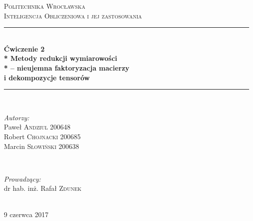 \begin{titlepage}

\newcommand{\HRule}{\rule{\linewidth}{0.5mm}} 
\center 

\textsc{\LARGE Politechnika Wrocławska}\\[1.5cm] 
\textsc{\Large Inteligencja Obliczeniowa i jej zastosowania}\\[0.5cm] 
\HRule \\[0.5cm]
{ \huge \bfseries Ćwiczenie 2 \\*
	Metody redukcji wymiarowości \\*
	– nieujemna faktoryzacja macierzy \\i dekompozycje tensorów}\\[0.5cm] 
\HRule \\[1.6cm]
 
\begin{minipage}{0.4\textwidth}
\begin{flushleft} \large
\emph{Autorzy:}\\
Paweł  \textsc{Andziul} 200648 \\
Robert  \textsc{Chojnacki} 200685 \\
Marcin  \textsc{Słowiński} 200638 \\
\end{flushleft}
\end{minipage}
~
\begin{minipage}{0.4\textwidth}
\begin{flushright} \large
\emph{Prowadzący:} \\
dr hab. inż. Rafał \textsc{Zdunek}
\end{flushright}
\end{minipage}\\[4cm]

\vfill 
{\large 9 czerwca 2017}\\[3cm] 

\end{titlepage}